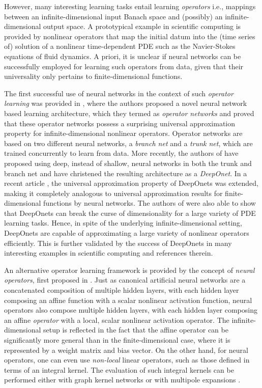 \documentclass[reqno,a4paper]{amsart}
\begin{document}
However, many interesting learning tasks entail learning \emph{operators} i.e., mappings between an infinite-dimensional input Banach space and (possibly) an infinite-dimensional output space. A prototypical example in scientific computing is provided by nonlinear operators that map the initial datum into the (time series of) solution of a nonlinear time-dependent PDE such as the Navier-Stokes equations of fluid dynamics. A priori, it is unclear if neural networks can be successfully employed for learning such operators from data, given that their universality only pertains to finite-dimensional functions. 
\par The first successful use of neural networks in the context of such \emph{operator learning} was provided in \cite{ChenChen}, where the authors proposed a novel neural network based learning architecture, which they termed as \emph{operator networks} and proved that these operator networks possess a surprising universal approximation property for infinite-dimensional nonlinear operators. Operator networks are based on two different neural networks, a \emph{branch net} and a \emph{trunk net}, which are trained concurrently to learn from data. More recently, the authors of \cite{deeponets} have proposed using deep, instead of shallow, neural networks in both the trunk and branch net and have christened the resulting architecture as a \emph{DeepOnet}. In a recent article \cite{LMK2021}, the universal approximation property of DeepOnets was extended, making it completely analogous to universal approximation results for finite-dimensional functions by neural networks. The authors of \cite{LMK2021} were also able to show that DeepOnets can break the curse of dimensionality for a large variety of PDE learning tasks. Hence, in spite of the underlying infinite-dimensional setting, DeepOnets are capable of approximating a large variety of nonlinear operators efficiently. This is further validated by the success of DeepOnets in many interesting examples in scientific computing \cite{donet2,donet3,donet4} and references therein.  

An alternative operator learning framework is provided by the concept of \emph{neural operators}, first proposed in \cite{li2020neural}. Just as canonical artificial neural networks are a concatenated composition of multiple hidden layers, with each hidden layer composing an affine function with a scalar nonlinear activation function, neural operators also compose multiple hidden layers, with each hidden layer composing an affine \emph{operator} with a local, scalar nonlinear activation operator. The infinite-dimensional setup is reflected in the fact that the affine operator can be significantly more general than in the finite-dimensional case, where it is represented by a weight matrix and bias vector. On the other hand, for neural operators, one can even use \emph{non-local} linear operators, such as those defined in terms of an integral kernel. The evaluation of such integral kernels can be performed either with graph kernel networks \cite{li2020neural} or with multipole expansions \cite{li2020multipole}. 
\end{document}
